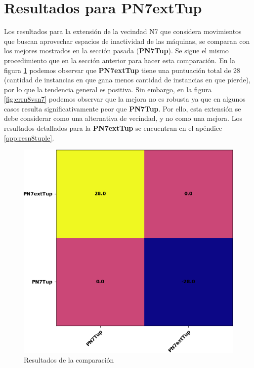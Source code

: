 \section{Resultados para PN7extTup}
Los resultados para la extensión de la vecindad N7 que considera movimientos que buscan aprovechar espacios de inactividad de las máquinas, se 
comparan con los mejores mostrados en la sección pasada (\textbf{PN7Tup}).
%
Se sigue el mismo procedimiento que en la sección anterior para hacer esta comparación.
%
En la figura \ref{fig:n8vsn7} podemos observar que \textbf{PN7extTup} tiene una puntuación total de 28 (cantidad de instancias en que gana menos cantidad
de instancias en que pierde), por lo que la tendencia general es positiva.
%
Sin embargo, en la figura \ref{fig:errn8vsn7} podemos observar que la mejora no es robusta ya que en algunos casos resulta significativamente 
peor que \textbf{PN7Tup}. 
%
Por ello, esta extensión se debe considerar como una alternativa de vecindad, y no como una mejora.
%
Los resultados detallados para la \textbf{PN7extTup} se encuentran en el apéndice \ref{app:resn8tuple}.


\begin{figure}[hbtp]
    \centering
    \includegraphics[scale=.7]{Imagenes/n8vsn7.png}
    \caption{Resultados de la comparación}
    \label{fig:n8vsn7}
\end{figure}

